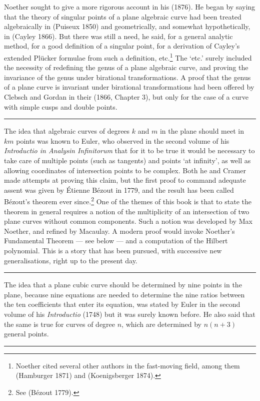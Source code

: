 Noether sought to give a more rigorous account in his (1876). He began by saying that the theory of singular points of a plane algebraic curve had been treated algebraically in (Puiseux 1850) and geometrically, and somewhat hypothetically,  in (Cayley 1866). But there was still a need, he said, for a general analytic method, for a good definition of a singular point, for a derivation of Cayley's extended Pl\"ucker formulae from such a definition, etc.\footnote{Noether cited several other authors in the fast-moving field, among them   (Hamburger 1871) and (Koenigsberger 1874).}  The `etc.' surely included the necessity of redefining the genus of a plane algebraic curve, and proving the invariance of the genus under birational  transformations.  A proof that the genus of a plane curve is invariant under birational transformations had been offered by Clebsch and Gordan in their (1866, Chapter 3), but only for the case of a curve with simple cusps and double points. 
\bigbreak\hrule\bigbreak


The idea that algebraic curves of degrees $k$ and $m$ in the plane should meet in $km$ points was known to  Euler, who observed in the second volume of his \emph{Introductio in Analysin Infinitorum} that for it to be true it would be necessary to take care of multiple points (such as tangents) and points `at infinity', as well as allowing coordinates of intersection points to be complex. Both he and Cramer made attempts at proving this claim, but the first proof to command adequate assent was given by \'Etienne B\'ezout in 1779, and the result has been called B\'ezout's theorem ever since.\footnote{See (B\'ezout 1779).} One of the themes of this book is that to state the theorem in general requires a notion of the multiplicity of an intersection of two plane curves without common components. Such a notion was developed by Max Noether, and refined by Macaulay. A modern proof would invoke Noether's Fundamental Theorem --- see below --- and a computation of the Hilbert polynomial. This is a story that  has been pursued, with successive new generalisations, right up to the present day. 

\bigbreak\hrule\bigbreak

The idea that a plane cubic curve should be determined by nine points in the plane, because nine equations are needed to determine the nine ratios between the ten coefficients that enter its equation, was stated by  Euler in the second volume of his \emph{Introductio} (1748)  but it was surely known before. He also said that the same is true for curves of degree $n$, which are determined by $ n(n+3)$ general points.
\bigbreak\hrule\bigbreak

